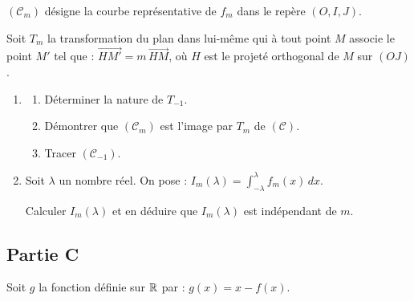 $(\mathscr{C}_m)$ désigne la courbe représentative de $f_m$ dans le repère $(O,I,J)$.

Soit $T_m$ la transformation du plan dans lui-même qui à tout point $M$ associe le point $M'$ tel que : $\overrightarrow{HM'}=m\,\overrightarrow{HM}$, où $H$ est le projeté orthogonal de $M$ sur $(OJ)$.

\begin{enumerate}
	\item
	\begin{enumerate}
		\item Déterminer la nature de $T_{-1}$.
		\item Démontrer que $(\mathscr{C}_m)$ est l'image par $T_m$ de $(\mathscr{C})$.
		\item Tracer $(\mathscr{C}_{-1})$.
	\end{enumerate}
	\item Soit $\lambda$ un nombre réel. On pose : $\displaystyle I_m(\lambda)=\int_{-\lambda}^{\lambda} f_m(x)\,dx$.

	Calculer $I_m(\lambda)$ et en déduire que $I_m(\lambda)$ est indépendant de $m$.
\end{enumerate}

\subsection*{Partie C}

Soit $g$ la fonction définie sur $\mathbb{R}$ par : $g(x)=x-f(x)$.

